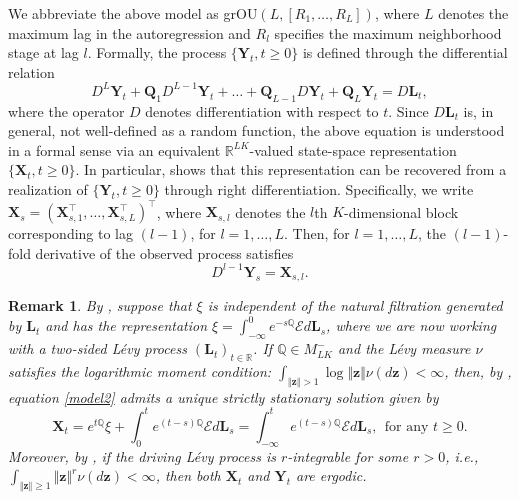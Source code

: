 \documentclass[12pt]{amsart}
\newtheorem{remark}{Remark}[section]
\numberwithin{equation}{section}
\newcommand{\1}{\mathbf{1}}
\begin{document}
We abbreviate the above model as grOU$(L,[R_1,\dots,R_L])$, where $L$ denotes the maximum lag in the autoregression and $R_l$ specifies the maximum neighborhood stage at lag $l$. Formally, the process $\{\mathbf{Y}_t,t\geq0\}$ is defined through the differential relation
\begin{equation*}
    D^L\mathbf{Y}_t+\mathbf{Q}_1D^{L-1}\mathbf{Y}_t+ \dots+\mathbf{Q}_{L-1}D\mathbf{Y}_t+\mathbf{Q}_L\mathbf{Y}_t = D\mathbf{L}_t,
\end{equation*}
where the operator $D$ denotes differentiation with respect to $t$. Since $D\mathbf{L}_t$ is, in general, not well-defined as a random function, the above equation is understood in a formal sense via an equivalent $\mathbb{R}^{LK}$-valued state-space representation $\{\mathbf{X}_t,t\geq0\}$. In particular, \cite[Proposition 2.1]{lucchese2026estimation} shows that this representation can be recovered from a realization of $\{\mathbf{Y}_t,t\geq0\}$ through right differentiation. Specifically, 
we write $\mathbf{X}_s=(\mathbf{X}_{s,1}^{\top},\ldots,\mathbf{X}_{s,L}^{\top})^{\top}$, where $\mathbf{X}_{s,l}$ denotes the $l$th $K$-dimensional block corresponding to lag $(l-1)$, for $l=1,\ldots, L$. Then, for $l=1,\dots,L$, the $(l-1)$-fold derivative of the observed process satisfies
\begin{equation*}
    D^{l-1}\mathbf{Y}_{s} = \mathbf{X}_{s,l}.
\end{equation*}

\begin{remark}\label{rem:stationay}
By \cite[Remark 2.1]{lucchese2026estimation}, suppose that $\xi$ is independent of the natural filtration generated by $\mathbf{L}_t$ and has the representation $\xi = \int_{-\infty}^0e^{-s\mathbb{Q}}\mathcal{E}d\mathbf{L}_s$, where we are now working with a two-sided L\'evy process $(\mathbf{L}_t)_{t\in \mathbb{R}}$. If $\mathbb{Q}\in M_{LK}^-$ and the L\'evy measure $\nu$ satisfies the logarithmic moment condition: $\int_{\Vert\mathbf{z}\Vert>1}\log\Vert\mathbf{z}\Vert\nu(d\mathbf{z})<\infty$, then, by \cite[Theorem 4.1]{SATO198473}, equation \eqref{model2} admits a unique strictly stationary solution given by
\begin{equation*}
    \mathbf{X}_t=e^{t\mathbb{Q}}\xi+\int_0^te^{(t-s)\mathbb{Q}}\mathcal{E}d\mathbf{L}_s=\int_{-\infty}^te^{(t-s)\mathbb{Q}}\mathcal{E}d\mathbf{L}_s, ~~\text{for any }t\geq 0.
\end{equation*}
Moreover, by \cite[Proposition 3.34]{marquardt2007multivariate}, if the driving L\'evy process is $r$-integrable for some $r>0$, i.e., $\int_{\Vert \mathbf{z}\Vert\geq1}\Vert \mathbf{z}\Vert^r\nu(d\mathbf{z})<\infty$, then both $\mathbf{X}_t$ and $\mathbf{Y}_t$ are ergodic.
\end{remark}
\end{document}
